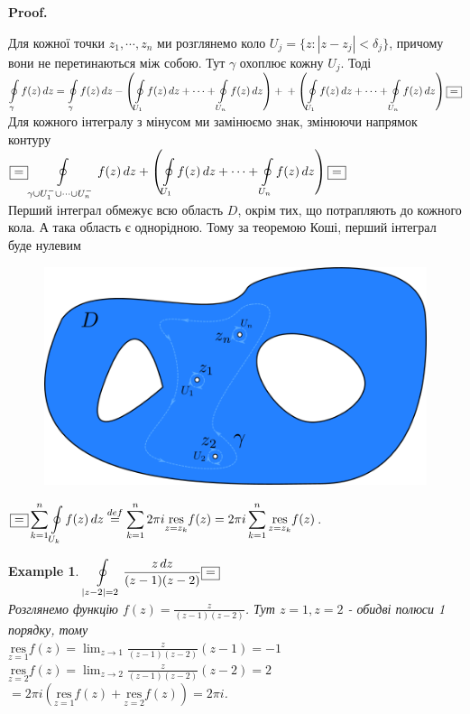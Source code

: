\documentclass[a4paper, 10pt]{article}
\makeatletter
\def\residue#1#2{\underset{z = {#1}}{\textrm{res}} {#2}}
\def\qed{$\blacksquare$}
\theoremstyle{theoremdd}
\theoremstyle{theoremdd}
\theoremstyle{theoremdd}
\theoremstyle{theoremdd}
\newtheorem{example}[theorem]{Example}
\theoremstyle{theoremdd}
\theoremstyle{theoremdd}
\theoremstyle{theoremdd}
\theoremstyle{theoremdd}
\renewenvironment{proof}[1][Proof.\\]{\par
\pushQED{\hfill \qed}%
\normalfont \topsep6\p@\@plus6\p@\relax
\trivlist
\item\relax
{\bfseries
#1\@addpunct{.}}\hspace\labelsep\ignorespaces
}{%
\popQED\endtrivlist\@endpefalse
}
\makeatother
\begin{document}
\begin{proof}
Для кожної точки $z_1,\cdots, z_n$ ми розглянемо коло $U_j = \{z: |z-z_j|<\delta_j\}$, причому вони не перетинаються між собою. Тут $\gamma$ охоплює кожну $U_j$. Тоді\\
$\displaystyle\oint\displaylimits_{\gamma} f(z)\,dz = \oint\displaylimits_{\gamma} f(z)\,dz - \left(\oint\displaylimits_{U_1} f(z)\,dz + \cdots + \oint\displaylimits_{U_n} f(z)\,dz   \right) +\\ + \left(\oint\displaylimits_{U_1} f(z)\,dz + \cdots + \oint\displaylimits_{U_n} f(z)\,dz   \right) \boxed{=}$ \\
Для кожного інтегралу з мінусом ми замінюємо знак, змінюючи напрямок контуру\\
$\boxed{=} \displaystyle \oint\displaylimits_{\gamma \cup U_1^- \cup \cdots \cup U_n^-} f(z)\,dz + \left(\oint\displaylimits_{U_1} f(z)\,dz + \cdots + \oint\displaylimits_{U_n} f(z)\,dz   \right) \boxed{=} $\\
Перший інтеграл обмежує всю область $D$, окрім тих, що потрапляють до кожного кола. А така область є однорідною. Тому за теоремою Коші, перший інтеграл буде нулевим\\
	\begin{figure}[h]
	\includegraphics[scale = 1]{path1377.png}
	\end{figure}
$\boxed{=} \displaystyle \sum_{k=1}^n \oint\displaylimits_{U_k} f(z)\,dz \overset{def}{=} \sum_{k=1}^n 2\pi i \residue{z_k}{f(z)} = 2\pi i \sum_{k=1}^n \residue{z_k}{f(z)}$.
\end{proof}

\begin{example}
$\displaystyle \oint\displaylimits_{|z-2|=2} \frac{z\,dz}{(z-1)(z-2)} \boxed{=}$\\
Розглянемо функцію $\displaystyle f(z) = \frac{z}{(z-1)(z-2)}$. Тут $z = 1, z = 2$ - обидві полюси 1 порядку, тому\\
$\displaystyle \residue{1}{f(z)} = \lim_{z \to 1} \frac{z}{(z-1)(z-2)} (z-1) = -1$\\
$\displaystyle \residue{2}{f(z)} = \lim_{z \to 2} \frac{z}{(z-1)(z-2)} (z-2) = 2$\\
$\boxed{=} 2 \pi i (\residue{1}{f(z)} + \residue{2}{f(z)}) = 2 \pi i$.
\end{example}
\end{document}
